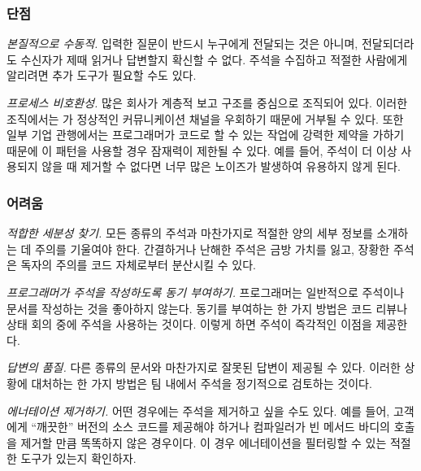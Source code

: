 \documentclass[a4paper,10pt,twoside]{book}
\begin{document}
\subsubsection*{단점}

\begin{bulletlist}
\item \emph{본질적으로 수동적.} 입력한 질문이 반드시 누구에게 전달되는 것은 아니며, 전달되더라도 수신자가 제때 읽거나 답변할지 확신할 수 없다. 주석을 수집하고 적절한 사람에게 알리려면 추가 도구가 필요할 수도 있다.


\item \emph{프로세스 비호환성.} 많은 회사가 계층적 보고 구조를 중심으로 조직되어 있다. 이러한 조직에서는 가 정상적인 커뮤니케이션 채널을 우회하기 때문에 거부될 수 있다. 또한 일부 기업 관행에서는 프로그래머가 코드로 할 수 있는 작업에 강력한 제약을 가하기 때문에 이 패턴을 사용할 경우 잠재력이 제한될 수 있다. 예를 들어, 주석이 더 이상 사용되지 않을 때 제거할 수 없다면 너무 많은 노이즈가 발생하여 유용하지 않게 된다.
\end{bulletlist}

\subsubsection*{어려움}

\begin{bulletlist}
\item \emph{적합한 세분성 찾기.} 모든 종류의 주석과 마찬가지로 적절한 양의 세부 정보를 소개하는 데 주의를 기울여야 한다. 간결하거나 난해한 주석은 금방 가치를 잃고, 장황한 주석은 독자의 주의를 코드 자체로부터 분산시킬 수 있다.

\item \emph{프로그래머가 주석을 작성하도록 동기 부여하기.} 프로그래머는 일반적으로 주석이나 문서를 작성하는 것을 좋아하지 않는다. 동기를 부여하는 한 가지 방법은 코드 리뷰나 상태 회의 중에 주석을 사용하는 것이다. 이렇게 하면 주석이 즉각적인 이점을 제공한다.

\item \emph{답변의 품질.}
다른 종류의 문서와 마찬가지로 잘못된 답변이 제공될 수 있다. 이러한 상황에 대처하는 한 가지 방법은 팀 내에서 주석을 정기적으로 검토하는 것이다.

\item \emph{에너테이션 제거하기.}
어떤 경우에는 주석을 제거하고 싶을 수도 있다. 예를 들어, 고객에게 ``깨끗한'' 버전의 소스 코드를 제공해야 하거나 컴파일러가 빈 메서드 바디의 호출을 제거할 만큼 똑똑하지 않은 경우이다. 이 경우 에너테이션을 필터링할 수 있는 적절한 도구가 있는지 확인하자.
\end{bulletlist}
\end{document}
